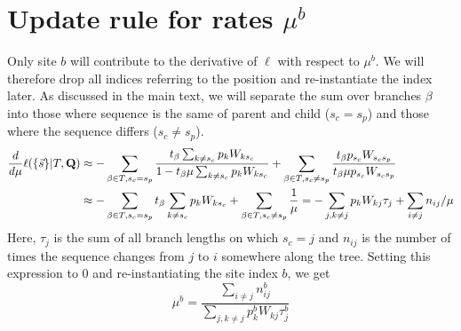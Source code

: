 \documentclass[aps,rmp,onecolumn]{revtex4}
\newcommand{\mat}[1]{{\bf #1}}
\newcommand{\eqp}{p}
\newcommand{\lh}{\ell}
\begin{document}
\section*{Update rule for rates $\mu^b$}
Only site $b$ will contribute to the derivative of $\lh$ with respect to $\mu^b$.
We will therefore drop all indices referring to the position and re-instantiate the index later.
As discussed in the main text, we will separate the sum over branches $\beta$ into those where sequence is the same of parent and child ($s_c=s_p$) and those where the sequence differs ($s_c\neq s_p$).
\begin{equation}
\begin{split}
	\frac{d}{d \mu} \lh (\{\vec{s}\} |T, \mat{Q}) &
	 \approx  -\sum_{\beta\in T,s_c=s_p} \frac{t_\beta \sum_{k\neq s_c} \eqp_{k} W_{k s_c}}{1 - t_\beta \mu \sum_{k\neq s_c} \eqp_k W_{ks_c}}
	 + \sum_{\beta\in T,s_c\neq s_p} \frac{t_\beta \eqp_{s_c} W_{s_cs_p}}{t_\beta \mu \eqp_{s_c} W_{s_c s_p}}\\
	 & \approx  -\sum_{\beta\in T,s_c=s_p} t_\beta \sum_{k\neq s_c} \eqp_{k} W_{k s_c} + \sum_{\beta\in T,s_c\neq s_p} \frac{1}{\mu} = - \sum_{j, k\neq j} \eqp_k W_{kj} \tau_j + \sum_{i\neq j} n_{ij}/\mu
\end{split}
\end{equation}
Here, $\tau_j$ is the sum of all branch lengths on which $s_c=j$ and $n_{ij}$ is the number of times the sequence changes from $j$ to $i$ somewhere along the tree.
Setting this expression to 0 and re-instantiating the site index $b$, we get
\begin{equation}
	\mu^b = \frac{\sum_{i\neq j} n^b_{ij}}{\sum_{j, k\neq j} \eqp^b_k W_{kj} \tau^b_j}
\end{equation}
\end{document}

